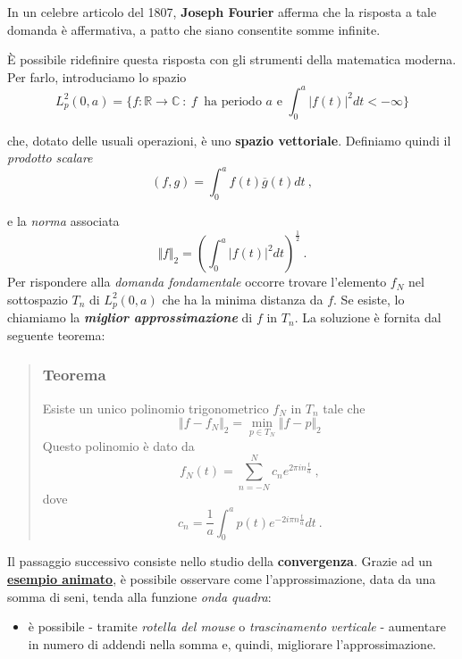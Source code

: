 \documentclass[
]{book}
\providecommand{\tightlist}{%
  \setlength{\itemsep}{0pt}\setlength{\parskip}{0pt}}
\begin{document}
In un celebre articolo del 1807, \textbf{Joseph Fourier} afferma che la risposta a tale domanda è affermativa, a patto che siano consentite somme infinite.

È possibile ridefinire questa risposta con gli strumenti della matematica moderna.
Per farlo, introduciamo lo spazio
\[L_{p}^2(0,a)= \{ f:\mathbb{R} \longrightarrow \mathbb{C} \ : \ f \ \text{ ha periodo } a \text{ e } \int_{0}^{a}|f(t)|^2dt < -\infty\bigg\}\]

che, dotato delle usuali operazioni, è uno \textbf{spazio vettoriale}. Definiamo quindi il \emph{prodotto scalare}
\[(f,g) = \int_{0}^{a} f(t) \overline{g}(t)dt \ ,\]

e la \emph{norma} associata
\[ \Vert f \Vert_2 = \left( \int_{0}^{a} |f(t)|^2 dt \right) ^{\textstyle \frac{1}{2}} \ .\]
Per rispondere alla \emph{domanda fondamentale} occorre trovare l'elemento \(f_N\) nel sottospazio \(T_n\) di \(L_{p}^{2}(0,a)\) che ha la minima distanza da \(f\). Se esiste, lo chiamiamo la \emph{\textbf{miglior approssimazione}} di \(f\) in \(T_{n}\).
La soluzione è fornita dal seguente teorema:

\begin{quote}
\hypertarget{teorema}{%
\subsubsection*{Teorema}\label{teorema}}

Esiste un unico polinomio trigonometrico \(f_N\) in \(T_n\) tale che
\[ \Vert f - f_N \Vert _{2} = \min_{p \in T_N} \Vert f - p \Vert _{2} \]
Questo polinomio è dato da
\begin{equation}
f_{N}(t)=\sum_{n=-N}^{N} c_{n}e^{2\pi in \textstyle \frac {t}{a}} \ ,
\label{eq:polsol}
\end{equation}
dove
\begin{equation}
c_n=\frac{1}{a} \int_{0}^{a}p(t)e^{-2 i \pi n \textstyle \frac {t}{a}}dt \ .
\label{eq:coeffsol}
\end{equation}
\end{quote}

Il passaggio successivo consiste nello studio della \textbf{convergenza}.
Grazie ad un \href{https://bradwave.github.io/thesis/animations/s4-animation.html}{\textbf{esempio animato}}, è possibile osservare come l'approssimazione, data da una somma di seni, tenda alla funzione \emph{onda quadra}:

\begin{itemize}
\tightlist
\item
  è possibile - tramite \emph{rotella del mouse} o \emph{trascinamento verticale} - aumentare in numero di addendi nella somma e, quindi, migliorare l'approssimazione.
\end{itemize}
\end{document}
